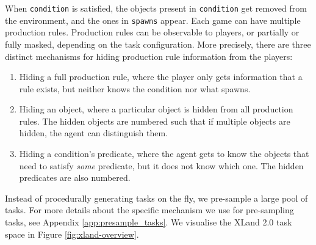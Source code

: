 \documentclass[11pt, a4paper, logo, copyright]{deepmind}
\begin{document}
When \texttt{condition} is satisfied, the objects present in \texttt{condition} get removed from the environment, and the ones in \texttt{spawns} appear.
Each game can have multiple production rules. Production rules can be observable to players, or partially or fully masked, depending on the task configuration. More precisely, there are three distinct mechanisms for hiding production rule information from the players:
\begin{enumerate}
    \item Hiding a full production rule, where the player only gets information that a rule exists, but neither knows the condition nor what spawns.
    \item Hiding an object, where a particular object is hidden from all production rules. The hidden objects are numbered such that if multiple objects are hidden, the agent can distinguish them.
    \item Hiding a condition's predicate, where the agent gets to know the objects that need to satisfy \textit{some} predicate, but it does not know which one. The hidden predicates are also numbered.
\end{enumerate}
Instead of procedurally generating tasks on the fly, we pre-sample a large pool of tasks. For more details about the specific mechanism we use for pre-sampling tasks, see Appendix \ref{app:presample_tasks}. We visualise the XLand 2.0 task space in Figure \ref{fig:xland-overview}.
\end{document}
